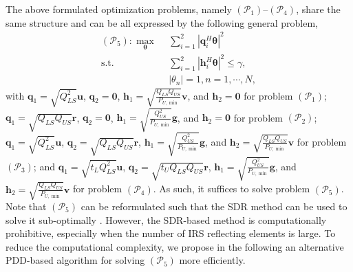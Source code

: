 \documentclass[10pt,final,doublecolumn]{IEEEtran}
\begin{document}
The above formulated optimization problems, namely $(\mathcal{P}_1)$--$(\mathcal{P}_4)$, share the same structure and can be all expressed by the following general problem,
\begin{subequations}
\begin{align}
(\mathcal{P}_5): \mathop{\max}\limits_{\boldsymbol{\theta}}~&~ \sum_{i=1}^{2}|\mathbf{q}_i^H
\boldsymbol{\theta}|^2 \label{OP01}\\
\text {s.t.}~&~\sum_{i=1}^{2}|{\mathbf{h}}_i^H
\boldsymbol{\theta}|^2\leq \gamma, \label{cc01}\\
~&~|{\theta}_{n}|= 1, n=1,\cdots,N, \label{cc03}
\end{align}
\end{subequations}
with $\mathbf{q}_1=\sqrt{{{Q_{LS}^2}}}\mathbf{u}$, $\mathbf{q}_2=\mathbf{0}$,
$\mathbf{h}_1=\sqrt{\frac{Q_{LS}Q_{US}}{P_{U,\min}}}\mathbf{v}$, and $\mathbf{h}_2=\mathbf{0}$ for problem $(\mathcal{P}_1)$;
$\mathbf{q}_1=\sqrt{{{Q_{LS}Q_{US}}}}\mathbf{r}$, $\mathbf{q}_2=\mathbf{0}$,
$\mathbf{h}_1=\sqrt{\frac{Q_{US}^2}{P_{U,\min}}}\mathbf{g}$, and $\mathbf{h}_2=\mathbf{0}$ for problem $(\mathcal{P}_2)$;
$\mathbf{q}_1=\sqrt{{{Q_{LS}^2}}}\mathbf{u}$, $\mathbf{q}_2=\sqrt{{{Q_{LS}Q_{US}}}}\mathbf{r}$,
$\mathbf{h}_1=\sqrt{\frac{Q_{US}^2}{P_{U,\min}}}\mathbf{g}$, and $\mathbf{h}_2=\sqrt{\frac{Q_{LS}Q_{US}}{P_{U,\min}}}\mathbf{v}$ for problem $(\mathcal{P}_3)$; and
$\mathbf{q}_1=\sqrt{t_L{{Q_{LS}^2}}}\mathbf{u}$, $\mathbf{q}_2=\sqrt{t_U{{Q_{LS}Q_{US}}}}\mathbf{r}$,
$\mathbf{h}_1=\sqrt{\frac{Q_{US}^2}{P_{U,\min}}}\mathbf{g}$, and $\mathbf{h}_2=\sqrt{\frac{Q_{LS}Q_{US}}{P_{U,\min}}}\mathbf{v}$ for problem $(\mathcal{P}_4)$.
As such, it suffices to solve problem $(\mathcal{P}_5)$. Note that  $(\mathcal{P}_5)$ can be reformulated such that the SDR method
can be used to solve it sub-optimally \cite{sdr}. However, the SDR-based method is computationally prohibitive, especially when the number of IRS reflecting elements is large. To reduce the computational complexity, we propose in the following an alternative PDD-based algorithm for solving $(\mathcal{P}_5)$ more efficiently.
\end{document}
